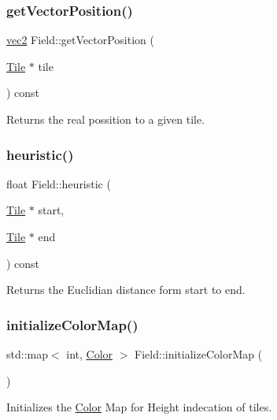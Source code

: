 \subsubsection{\texorpdfstring{get\+Vector\+Position()}{getVectorPosition()}}
{\footnotesize\ttfamily \hyperlink{structvec2}{vec2} Field\+::get\+Vector\+Position (\begin{DoxyParamCaption}\item[{\hyperlink{classTile}{Tile} $\ast$}]{tile }\end{DoxyParamCaption}) const}

\begin{DoxyReturn}{Returns}
the real possition to a given tile. 
\end{DoxyReturn}
\mbox{\label{classField_a1b07030b79bb1e68dbf82aff2bd45730}} 
\subsubsection{\texorpdfstring{heuristic()}{heuristic()}}
{\footnotesize\ttfamily float Field\+::heuristic (\begin{DoxyParamCaption}\item[{\hyperlink{classTile}{Tile} $\ast$}]{start,  }\item[{\hyperlink{classTile}{Tile} $\ast$}]{end }\end{DoxyParamCaption}) const}

Returns the Euclidian distance form start to end. \mbox{\label{classField_aeb9f68e86153bfefe2191149fdd840ed}} 
\subsubsection{\texorpdfstring{initialize\+Color\+Map()}{initializeColorMap()}}
{\footnotesize\ttfamily std\+::map$<$ int, \hyperlink{structColor}{Color} $>$ Field\+::initialize\+Color\+Map (\begin{DoxyParamCaption}{ }\end{DoxyParamCaption})\hspace{0.3cm}{\ttfamily [static]}}

Initializes the \hyperlink{structColor}{Color} Map for Height indecation of tiles. \mbox{\label{classField_a908ce6baa14bf69944f63caed4032a8a}} 
